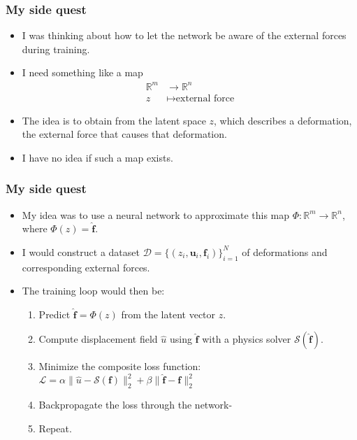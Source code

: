 \documentclass{beamer}
\begin{document}
\begin{frame}
    \frametitle{My side quest}
    \begin{itemize}
        \item I was thinking about how to let the network be aware of the external forces during training.
        \item I need something like a map 
        \begin{align*}
            \mathbb{R}^m &\to \mathbb{R}^n \\
            z &\mapsto \text{external force}
        \end{align*}
        \item The idea is to obtain from the latent space \( z \), which describes a deformation, the external force that causes that deformation.
        \item I have no idea if such a map exists.
    \end{itemize}
\end{frame}

\begin{frame}
    \frametitle{My side quest}
        \begin{itemize}
            \item My idea was to use a neural network to approximate this map $\Phi: \mathbb{R}^m \rightarrow \mathbb{R}^n$, where $\Phi(z) = \hat{\mathbf{f}}$.
            \item I would construct a dataset $\mathcal{D} = \{(z_i, \mathbf{u}_i, \mathbf{f}_i)\}_{i=1}^N$ of deformations and corresponding external forces.
            \item The training loop would then be:
            \begin{enumerate}
                \item Predict $\hat{\mathbf{f}} = \Phi(z)$ from the latent vector $z$.
                \item Compute displacement field $\hat{u}$ using $\hat{\mathbf{f}}$ with a physics solver $\mathcal{S}(\hat{\mathbf{f}})$.
                \item Minimize the composite loss function:
                    $\mathcal{L} = \alpha\|\hat{u} - \mathcal{S}(\mathbf{f})\|_2^2 + \beta\|\hat{\mathbf{f}} - \mathbf{f}\|_2^2$
                \item Backpropagate the loss through the network-
                \item Repeat.
            \end{enumerate}
        \end{itemize}
\end{frame}
\end{document}
